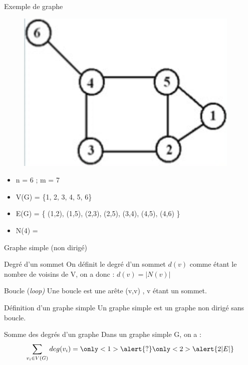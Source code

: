 \documentclass[10pt,xcolor=dvipsnames]{beamer}
\newcommand{\defin}[1]{\textcolor{darkspringgreen}{#1}}
\begin{document}
\begin{frame}{Exemple de graphe}
    \begin{figure}
        \centering
        \includegraphics[scale=0.35]{figures/CM3/graph-example.png}
        \label{fig:my_label}
    \end{figure}
    \begin{itemize}
        \item n = 6 ; m = 7
        \item V(G) = \{1, 2, 3, 4, 5, 6\}
        \item E(G) = \{ (1,2), (1,5), (2,3), (2,5), (3,4), (4,5), (4,6) \}
        \item N(4) =  
    \end{itemize}
\end{frame}


\begin{frame}{Graphe simple (non dirigé)}
    \begin{exampleblock}{Degré d'un sommet}
    On définit le degré d'un sommet $d(v)$ comme étant le nombre de voisins de V, on a donc :
    $d(v) = |N(v)|$
    \end{exampleblock}
    
    \begin{exampleblock}{Boucle (\textit{loop)}}
    Une boucle est une arête (v,v) , v étant un sommet.
    \end{exampleblock}
    
    \begin{exampleblock}{Définition d'un graphe simple}
    Un graphe simple est un graphe non dirigé sans \defin{boucle}.
    \end{exampleblock}
    
    \begin{alertblock}{Somme des degrés d'un graphe}
        Dans un graphe simple G, on a :
        \begin{equation*}
            \sum_{v_i \in V(G)}deg(v_i) = \only<1>{\alert{?}} \only<2>{\alert{2|E|}}
        \end{equation*}
    \end{alertblock}
    
\end{frame}
\end{document}
